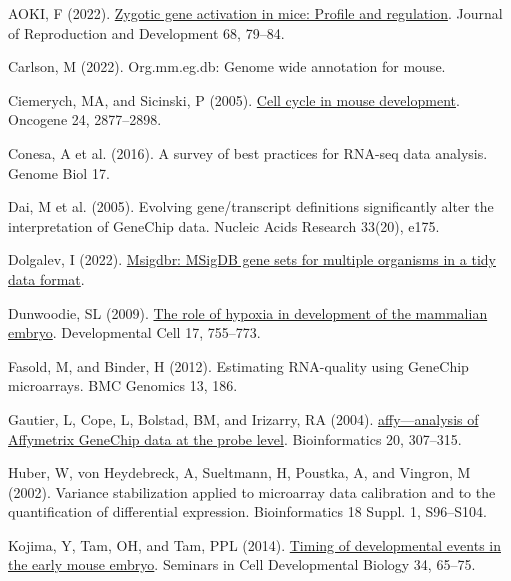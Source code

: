 \documentclass[
  parskip,
  oneside]{scrreprt}
\newlength{\cslhangindent}
\newlength{\cslentryspacingunit} %
\newenvironment{CSLReferences}[2] %
 {%
  \setlength{\parindent}{0pt}
  \ifodd #1
  \let\oldpar\par
  \def\par{\hangindent=\cslhangindent\oldpar}
  \fi
  \setlength{\parskip}{#2\cslentryspacingunit}
 }%
 {}
\begin{document}
\hypertarget{refs}{}
\begin{CSLReferences}{0}{0}
\leavevmode{}%
AOKI, F (2022). \href{https://doi.org/10.1262/jrd.2021-129}{Zygotic gene
activation in mice: Profile and regulation}. Journal of Reproduction and
Development 68, 79--84.

\leavevmode{}%
Carlson, M (2022). Org.mm.eg.db: Genome wide annotation for mouse.

\leavevmode{}%
Ciemerych, MA, and Sicinski, P (2005).
\href{https://doi.org/10.1038/sj.onc.1208608}{Cell cycle in mouse
development}. Oncogene 24, 2877--2898.

\leavevmode{}%
Conesa, A et al. (2016). A survey of best practices for {RNA-seq} data
analysis. Genome Biol 17.

\leavevmode{}%
Dai, M et al. (2005). Evolving gene/transcript definitions significantly
alter the interpretation of GeneChip data. Nucleic Acids Research
33(20), e175.

\leavevmode{}%
Dolgalev, I (2022).
\href{https://CRAN.R-project.org/package=msigdbr}{Msigdbr: MSigDB gene
sets for multiple organisms in a tidy data format}.

\leavevmode{}%
Dunwoodie, SL (2009).
\href{https://doi.org/10.1016/j.devcel.2009.11.008}{The role of hypoxia
in development of the mammalian embryo}. Developmental Cell 17,
755--773.

\leavevmode{}%
Fasold, M, and Binder, H (2012). Estimating {RNA-quality} using
{GeneChip} microarrays. BMC Genomics 13, 186.

\leavevmode{}%
Gautier, L, Cope, L, Bolstad, BM, and Irizarry, RA (2004).
\href{https://doi.org/10.1093/bioinformatics/btg405}{{affy---analysis of
Affymetrix GeneChip data at the probe level}}. Bioinformatics 20,
307--315.

\leavevmode{}%
Huber, W, von Heydebreck, A, Sueltmann, H, Poustka, A, and Vingron, M
(2002). Variance stabilization applied to microarray data calibration
and to the quantification of differential expression. Bioinformatics 18
Suppl. 1, S96--S104.

\leavevmode{}%
Kojima, Y, Tam, OH, and Tam, PPL (2014).
\href{https://doi.org/10.1016/j.semcdb.2014.06.010}{Timing of
developmental events in the early mouse embryo}. Seminars in Cell
Developmental Biology 34, 65--75.


\end{CSLReferences}
\end{document}
